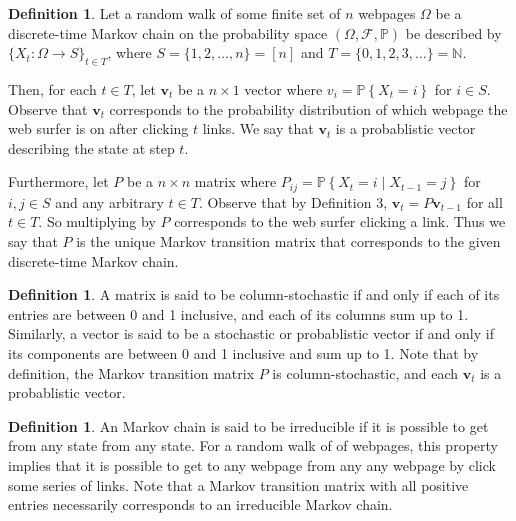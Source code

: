 \documentclass[11pt]{article}
\theoremstyle{definition}
\newtheorem{definition}[theorem]{Definition}
\newcommand{\N}{\mathbb{N}}
\newcommand{\p}[1]{\mathbb{P}\left\{#1\right\}}
\renewcommand{\vec}[1]{\mathbf{#1}}
\begin{document}
\begin{definition}
    Let a random walk of some finite set of $n$ webpages $\Omega$ be a discrete-time Markov chain on the probability space $(\Omega, \mathcal{F}, \mathbb{P})$
    be described by $\{X_t : \Omega \to S\}_{t \in T}$, where $S = \{1, 2, \ldots, n\} = [n]$ and $T = \{0, 1, 2, 3, \ldots\} = \N$.
    
    Then, for each $t \in T$, let $\vec{v}_t$ be a $n \times 1$ vector
    where $v_i = \p{X_t = i}$ for $i \in S$.
    Observe that $\vec{v}_t$ corresponds to the probability distribution of which webpage the web surfer is on after clicking $t$ links.
    We say that $\vec{v}_t$ is a probablistic vector describing the state at step $t$.

    Furthermore, let $P$ be a $n \times n$ matrix
    where $P_{ij} = \p{X_t = i \mid X_{t-1} = j}$ for $i, j \in S$ and any arbitrary $t \in T$. Observe that by Definition 3, $\vec{v}_t = P \vec{v}_{t-1}$ for all $t \in T$.
    So multiplying by $P$ corresponds to the web surfer clicking a link.
    Thus we say that $P$ is the unique Markov transition matrix that corresponds to the given discrete-time Markov chain.
\end{definition}

\begin{definition}
    A matrix is said to be column-stochastic if and only if each of its entries are between 0 and 1 inclusive, and each of its columns sum up to 1.
    Similarly, a vector is said to be a stochastic or probablistic vector if and only if its components are between 0 and 1 inclusive and sum up to 1.
    Note that by definition, the Markov transition matrix $P$ is column-stochastic, and each $\vec{v}_t$ is a probablistic vector.
\end{definition}

\begin{definition}
    An Markov chain is said to be irreducible if it is possible to get from any state from any state.
    For a random walk of of webpages, this property implies that it is possible to get to any webpage from any any webpage by click some series of links.
    Note that a Markov transition matrix with all positive entries necessarily corresponds to an irreducible Markov chain.
\end{definition}
\end{document}
